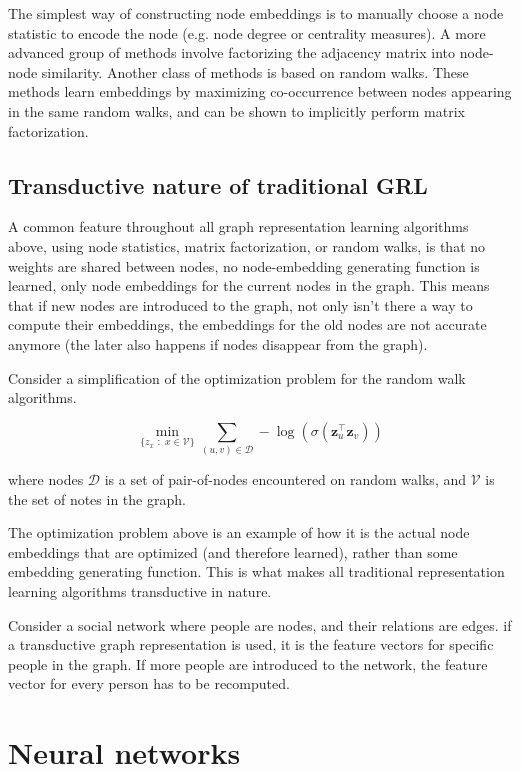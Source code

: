 \documentclass[ oneside,openright,titlepage,numbers=noenddot,headinclude,%
                footinclude=true,cleardoublepage=empty,abstractoff, %
                BCOR=0mm,paper=a4,fontsize=11pt,%
                ngerman,american,%
                ]{scrreprt}
\begin{document}
The simplest way of constructing node embeddings is to manually choose a node statistic to encode the node (e.g. node degree or centrality measures). A more advanced group of methods involve factorizing the adjacency matrix into node-node similarity. Another class of methods is based on random walks. These methods learn embeddings by maximizing co-occurrence between nodes appearing in the same random walks, and can be shown to implicitly perform matrix factorization.


\subsection{Transductive nature of traditional GRL}
A common feature throughout all graph representation learning algorithms above, using node statistics, matrix factorization, or random walks, is that no weights are shared between nodes, no node-embedding generating function is learned, only node embeddings for the current nodes in the graph. This means that if new nodes are introduced to the graph, not only isn't there a way to compute their embeddings, the embeddings for the old nodes are not accurate anymore (the later also happens if nodes disappear from the graph).

Consider a simplification of the optimization problem for the random walk algorithms.

\[
\min_{\{z_x \,\,: \,\,x \in \mathcal{V} \}}
\sum_{(u,v)\in\mathcal{D}}
-\log\left(\sigma(\mathbf{z}_u^\top \mathbf{z}_v)\right)
\]

where nodes $\mathcal{D}$ is a set of pair-of-nodes encountered on random walks, and $\mathcal{V}$ is the set of notes in the graph. 

The optimization problem above is an example of how it is the actual node embeddings that are optimized (and therefore learned), rather than some embedding generating function. This is what makes all traditional representation learning algorithms transductive in nature.

Consider a social network where people are nodes, and their relations are edges. if a transductive graph representation is used, it is the feature vectors for specific people in the graph. If more people are introduced to the network, the feature vector for every person has to be recomputed.


\section{Neural networks}
\end{document}
